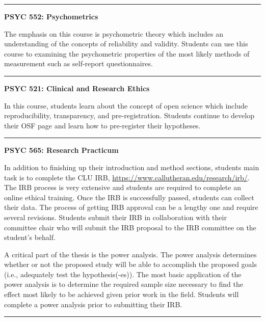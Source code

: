 \documentclass[openany]{book}
\begin{document}
\begin{center}\rule{0.5\linewidth}{0.5pt}\end{center}

\textbf{PSYC 552: Psychometrics}

The emphasis on this course is psychometric theory which includes an understanding of the concepts of reliability and validity. Students can use this course to examining the psychometric properties of the most likely methods of measurement such as self-report questionnaires.

\begin{center}\rule{0.5\linewidth}{0.5pt}\end{center}

\textbf{PSYC 521: Clinical and Research Ethics}

In this course, students learn about the concept of open science which include reproducibility, transparency, and pre-registration. Students continue to develop their OSF page and learn how to pre-register their hypotheses.

\begin{center}\rule{0.5\linewidth}{0.5pt}\end{center}

\textbf{PSYC 565: Research Practicum}

In addition to finishing up their introduction and method sections, students main task is to complete the CLU IRB, \url{https://www.callutheran.edu/research/irb/}. The IRB process is very extensive and students are required to complete an online ethical training. Once the IRB is successfully passed, students can collect their data. The process of getting IRB approval can be a lengthy one and require several revisions. Students submit their IRB in collaboration with their committee chair who will submit the IRB proposal to the IRB committee on the student's behalf.

A critical part of the thesis is the power analysis. The power analysis determines whether or not the proposed study will be able to accomplish the proposed goals (i.e., adequately test the hypothesis(-es)). The most basic application of the power analysis is to determine the required sample size necessary to find the effect most likely to be achieved given prior work in the field. Students will complete a power analysis prior to submitting their IRB.

\begin{center}\rule{0.5\linewidth}{0.5pt}\end{center}
\end{document}
